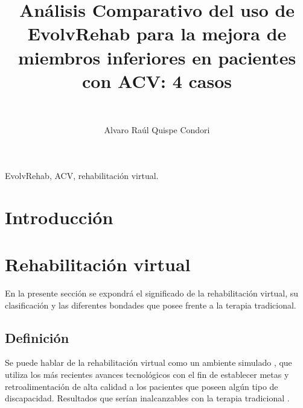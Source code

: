 \documentclass[journal]{IEEEtran}
\begin{document}
\title{Análisis Comparativo del uso de EvolvRehab para la mejora de miembros inferiores en pacientes con ACV: 4 casos}

\author{%
\\
}
\author{Alvaro Raúl Quispe Condori\\
}


\maketitle

\begin{abstract}

\end{abstract}

\begin{IEEEkeywords}
    EvolvRehab, ACV, rehabilitación virtual.
\end{IEEEkeywords}


\section{Introducción}
\section{Rehabilitación virtual}
En la presente sección se expondrá el significado de la rehabilitación virtual, su clasificación y las diferentes bondades que posee frente a la terapia tradicional.
\subsection{Definición}
Se puede hablar de la rehabilitación virtual como un ambiente simulado \cite{sutherland1965ultimate}, que utiliza los más recientes avances tecnológicos con el fin de establecer metas y retroalimentación de alta calidad a los pacientes que poseen algún tipo de discapacidad. Resultados que serían inalcanzables con la terapia tradicional \cite{weiss2009moving}.
\end{document}
